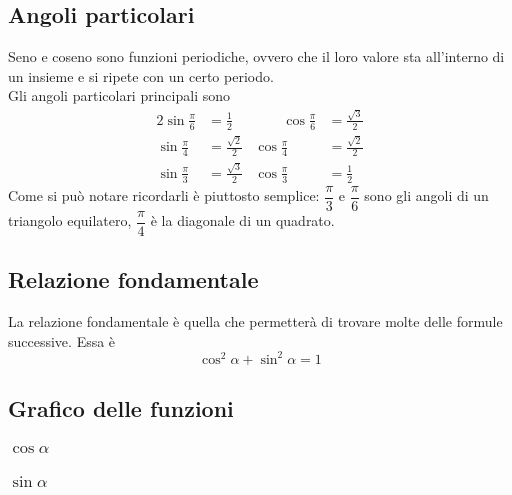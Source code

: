 \subsection{Angoli particolari}
Seno e coseno sono funzioni periodiche, ovvero che il loro valore sta all'interno di un insieme e si
ripete con un certo periodo.\\
Gli angoli particolari principali sono
\begin{alignat*}{2}
\sin\frac{\pi}{6} &= \frac{1}{2} &\qquad \cos\frac{\pi}{6} &= \frac{\sqrt{3}}{2}\\
\sin\frac{\pi}{4} &= \frac{\sqrt{2}}{2} & \cos\frac{\pi}{4} &= \frac{\sqrt{2}}{2}\\
\sin\frac{\pi}{3} &= \frac{\sqrt{3}}{2} & \cos\frac{\pi}{3} &= \frac{1}{2}
\end{alignat*}
Come si può notare ricordarli è piuttosto semplice: $\dfrac{\pi}{3}$ e $\dfrac{\pi}{6}$ sono gli 
angoli di un triangolo equilatero, $\dfrac{\pi}{4}$ è la diagonale di un quadrato.

\subsection{Relazione fondamentale}
La relazione fondamentale è quella che permetterà di trovare molte delle formule successive. Essa è
\begin{equation*}
\cos^2\alpha + \sin^2\alpha = 1
\end{equation*}

\subsection{Grafico delle funzioni}
\subsubsection{$\cos\alpha$}
\begin{center}
\end{center}
\subsubsection{$\sin\alpha$}
\begin{center}
\end{center}
